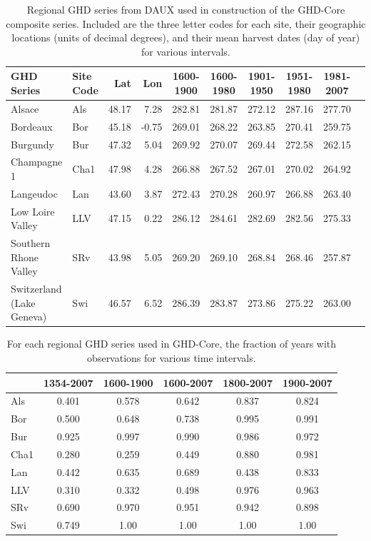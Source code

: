 \documentclass[12pt]{article}
\begin{document}
\begin{table}
\small
\caption{\small Regional GHD series from DAUX used in construction of the GHD-Core composite series. Included are the three letter codes for each site, their geographic locations (units of decimal degrees), and their mean harvest dates (day of year) for various intervals.}
\centering
\begin{tabular}{l l | r r | c c c c c p{5cm} |}
\hline
 \bf GHD Series & \bf Site Code & \bf Lat & \bf Lon & \bf 1600-1900 & \bf 1600-1980 & \bf 1901-1950 & \bf 1951-1980 & \bf 1981-2007 \\
\hline
Alsace	& Als & 48.17 & 7.28 & 282.81 & 281.87 & 272.12 & 287.16	 & 277.70 \\
Bordeaux	& Bor	& 45.18 & -0.75	& 269.01 & 	268.22	&  263.85 &  270.41 &  259.75\\
Burgundy	& Bur	& 47.32	& 5.04	& 269.92	& 270.07	& 269.44	& 272.58	& 262.15\\
Champagne 1	& Cha1	& 47.98	& 4.28	& 266.88	& 267.52	& 267.01	& 270.02	& 264.92\\
Langeudoc & Lan	& 43.60 & 3.87	& 272.43 &	270.28	& 260.97	& 266.88	& 263.40\\
Low Loire Valley	& LLV	& 47.15	& 0.22	& 286.12	& 284.61	& 282.69	& 282.56	& 275.33\\
Southern Rhone Valley	& SRv	& 43.98	& 5.05	& 269.20	& 269.10	& 268.84	& 268.46	& 257.87\\
Switzerland (Lake Geneva)	& Swi	& 46.57	& 6.52	& 286.39	& 283.87	& 273.86	& 275.22	& 263.00\\
\hline
\end{tabular}
\end{table}

\begin{table}
\small
\caption{\small For each regional GHD series used in GHD-Core, the fraction of years with observations for various time intervals.}
\centering
\begin{tabular}{l c c c c c}
\hline
 & \bf 1354-2007 & \bf 1600-1900 & \bf 1600-2007 & \bf 1800-2007 & \bf 1900-2007\\
\hline
Als	& 0.401 & 0.578 & 0.642 & 0.837	 & 0.824\\
Bor	 & 0.500 & 0.648 & 0.738 & 0.995 & 0.991\\
Bur & 	0.925	& 0.997	& 0.990	& 0.986	& 0.972\\
Cha1	& 0.280	& 0.259	& 0.449	& 0.880	& 0.981\\
Lan	& 0.442 & 0.635	& 0.689	& 0.438	& 0.833\\
LLV	& 0.310	& 0.332	& 0.498	& 0.976	& 0.963\\
SRv	& 0.690	& 0.970	& 0.951	& 0.942	& 0.898\\
Swi 	& 0.749	& 1.00 & 1.00	& 1.00	& 1.00\\
\hline
\end{tabular}
\end{table}
\end{document}

